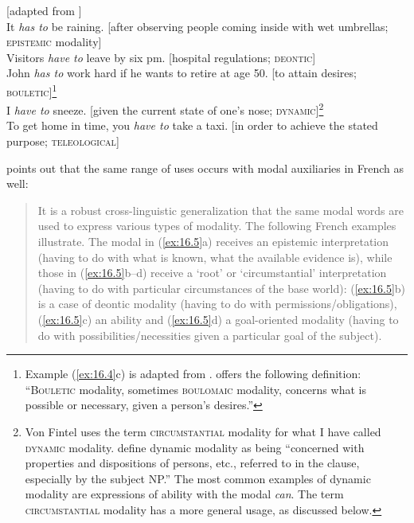 \ea \label{ex:16.4}
{}[adapted from \citealt{vonFintel2006}]\\
\ea  It \textit{has to} be raining. [after observing people coming inside with wet umbrellas;\\
  \textsc{epistemic} modality]\\
\ex Visitors \textit{have to} leave by six pm. [hospital regulations; \textsc{deontic}]\\
\ex John \textit{has to} work hard if he wants to retire at age 50. [to attain desires; \textsc{bouletic}]\footnote{Example (\ref{ex:16.4}c) is adapted from \citet{Hacquard2011}.  offers the following definition: “\textsc{Bouletic} modality, sometimes \textsc{boulomaic} modality, concerns what is possible or necessary, given a person’s desires.”}\\
\ex I \textit{have to} sneeze. [given the current state of one’s nose; \textsc{dynamic}]\footnote{Von Fintel uses the term \textsc{circumstantial} modality for what I have called \textsc{dynamic} modality.    \citet[178]{HuddlestonPullum2002} define dynamic modality as being “concerned with properties and dispositions of persons, etc., referred to in the clause, especially by the subject NP.” The most common examples of dynamic modality are expressions of ability with the modal \textit{can}. The term \textsc{circumstantial} modality has a more general usage, as discussed below.}\\
\ex To get home in time, you \textit{have to} take a taxi. [in order to achieve the stated purpose;   \textsc{teleological}]
\z \z


\citet{Hacquard2007} points out that the same range of uses occurs with modal auxiliaries in French as well:


\begin{quote}
It is a robust cross-linguistic generalization that the same modal words are used to express various types of modality. The following French examples illustrate. The modal in (\ref{ex:16.5}a) receives an epistemic interpretation (having to do with what is known, what the available evidence is), while those in (\ref{ex:16.5}b--d) receive a ‘root’ or ‘circumstantial’ interpretation (having to do with particular circumstances of the base world): (\ref{ex:16.5}b) is a case of deontic modality (having to do with permissions/obligations), (\ref{ex:16.5}c) an ability and (\ref{ex:16.5}d) a goal-oriented modality (having to do with possibilities/necessities given a particular goal of the subject).
\end{quote}


